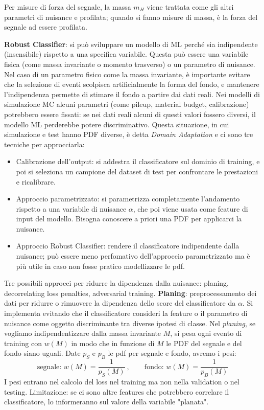 \documentclass{article}
\begin{document}
Per misure di forza del segnale, la massa $m_H$ viene trattata come gli altri parametri di nuisance e profilata; quando si fanno misure di massa, è la forza del segnale ad essere profilata.\newline

\textbf{Robust Classifier}: si può sviluppare un modello di ML perché sia indipendente (insensibile) rispetto a una specifica variabile. Questa può essere una variabile fisica (come massa invariante o momento trasverso) o un parametro di nuisance.\newline
Nel caso di un parametro fisico come la massa invariante, è importante evitare che la selezione di eventi scolpisca artificialmente la forma del fondo, e mantenere l'indipendenza permette di stimare il fondo a partire dai dati reali.\newline
Nei modelli di simulazione MC alcuni parametri (come pileup, material budget, calibrazione) potrebbero essere fissati: se nei dati reali alcuni di questi
valori fossero diversi, il modello ML perderebbe potere discriminativo.\newline
Questa situazione, in cui simulazione e test hanno PDF diverse, è detta \textit{Domain Adaptation} e ci sono tre tecniche per approcciarla:
\begin{itemize}
    \item Calibrazione dell'output: si addestra il classificatore sul dominio di training, e poi si seleziona un campione del dataset di test per confrontare le prestazioni e ricalibrare.
    \item Approccio parametrizzato: si parametrizza completamente l'andamento rispetto a una variabile di nuisance $\alpha$, che poi viene usata come feature di input del modello. Bisogna conoscere a priori una PDF per applicarci la nuisance.
    \item Approccio Robust Classifier: rendere il classificatore indipendente dalla nuisance; può essere meno perfomativo dell'approccio parametrizzato ma è più utile in caso non fosse pratico modellizzare le pdf.
\end{itemize}

Tre possibili approcci per ridurre la dipendenza dalla nuisance: planing, decorrelating loss penalties, adversarial training.\newline
\textbf{Planing}: preprocessamento dei dati per ridurre o rimuovere la dipendenza dello score del classificatore da $\alpha$.
Si implementa evitando che il classificatore consideri la feature o il parametro di nuisance come oggetto discriminante tra diverse ipotesi di classe. 
Nel \textit{planing}, se vogliamo indipendentizzare dalla massa invariante $M$, si pesa ogni evento di training con $w(M)$ in modo che in funzione di $M$ le PDF del segnale e del fondo siano uguali. Date $p_S$ e $p_B$ le pdf per segnale e fondo,
avremo i pesi:
\[
\text{segnale: } w(M)=\frac{1}{p_S(M)}\ , \qquad \text{fondo: } w(M)=\frac{1}{p_B(M)}
\]
I pesi entrano nel calcolo del loss nel training ma non nella validation o nel testing.\newline
Limitazione: se ci sono altre features che potrebbero correlare il classificatore, lo informeranno sul valore della variabile "planata".\newline
\end{document}
